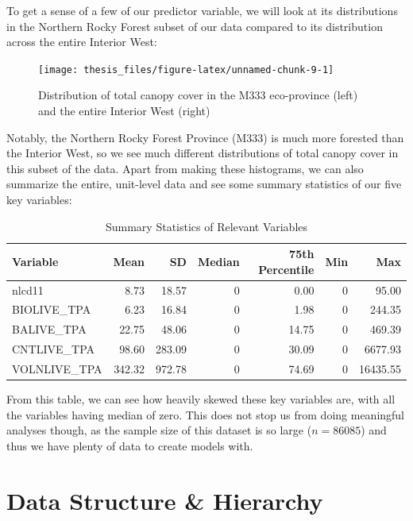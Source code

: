 \documentclass[12pt,twoside]{reedthesis}
\begin{document}
To get a sense of a few of our predictor variable, we will look at its distributions in the Northern Rocky Forest subset of our data compared to its distribution across the entire Interior West:
\begin{figure}

{\centering \texttt{[image: thesis\_files/figure-latex/unnamed-chunk-9-1]} 

}

\caption[Total canopy cover in the M333 eco-province and Interior West]{Distribution of total canopy cover in the M333 eco-province (left) and the entire Interior West (right)}\label{fig:unnamed-chunk-9}
\end{figure}
Notably, the Northern Rocky Forest Province (M333) is much more forested than the Interior West, so we see much different distributions of total canopy cover in this subset of the data. Apart from making these histograms, we can also summarize the entire, unit-level data and see some summary statistics of our five key variables:
\begin{longtable}[t]{lrrrrrr}
\caption[Summary Statistics of Relevant Variables]{\label{tab:unnamed-chunk-10}Summary Statistics of Relevant Variables}\\
\toprule
Variable & Mean & SD & Median & 75th Percentile & Min & Max\\
\midrule
nlcd11 & 8.73 & 18.57 & 0 & 0.00 & 0 & 95.00\\
BIOLIVE\_TPA & 6.23 & 16.84 & 0 & 1.98 & 0 & 244.35\\
BALIVE\_TPA & 22.75 & 48.06 & 0 & 14.75 & 0 & 469.39\\
CNTLIVE\_TPA & 98.60 & 283.09 & 0 & 30.09 & 0 & 6677.93\\
VOLNLIVE\_TPA & 342.32 & 972.78 & 0 & 74.69 & 0 & 16435.55\\
\bottomrule
\end{longtable}
From this table, we can see how heavily skewed these key variables are, with all the variables having median of zero. This does not stop us from doing meaningful analyses though, as the sample size of this dataset is so large (\(n = 86085\)) and thus we have plenty of data to create models with.

\hypertarget{data-structure-hierarchy}{%
\section{Data Structure \& Hierarchy}\label{data-structure-hierarchy}}
\end{document}
